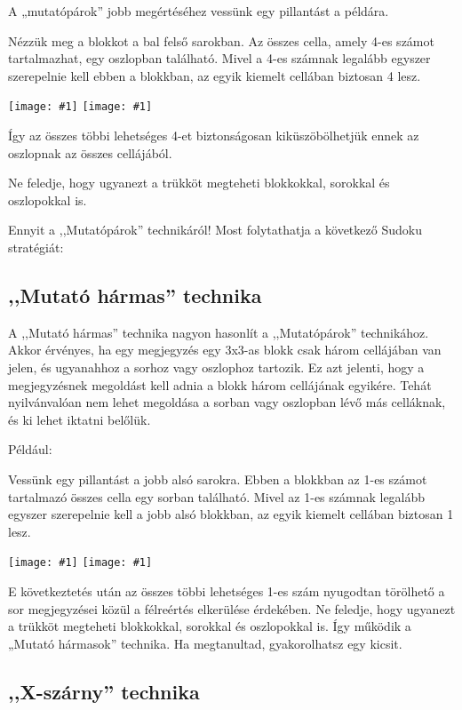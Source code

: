 \documentclass[a4paper,12pt,twoside]{article}
\newcommand{\kep}[1]{\texttt{[image: \#1]}}
\begin{document}
A „mutatópárok” jobb megértéséhez vessünk egy pillantást a példára.

Nézzük meg a blokkot a bal felső sarokban. Az összes cella, amely 4-es számot tartalmazhat, egy oszlopban található. Mivel a 4-es számnak legalább egyszer szerepelnie kell ebben a blokkban, az egyik kiemelt cellában biztosan 4 lesz.

\kep{1646982767-11. Pointing pairs_1.png}
\kep{1646982767-11. Pointing pairs_2.png}

Így az összes többi lehetséges 4-et biztonságosan kiküszöbölhetjük ennek az oszlopnak az összes cellájából.

Ne feledje, hogy ugyanezt a trükköt megteheti blokkokkal, sorokkal és oszlopokkal is.

Ennyit a ,,Mutatópárok'' technikáról! Most folytathatja a következő Sudoku stratégiát:

\clearpage
\subsection{,,Mutató hármas'' technika}

A ,,Mutató hármas'' technika nagyon hasonlít a ,,Mutatópárok'' technikához. Akkor érvényes, ha egy megjegyzés egy 3x3-as blokk csak három cellájában van jelen, és ugyanahhoz a sorhoz vagy oszlophoz tartozik. Ez azt jelenti, hogy a megjegyzésnek megoldást kell adnia a blokk három cellájának egyikére. Tehát nyilvánvalóan nem lehet megoldása a sorban vagy oszlopban lévő más celláknak, és ki lehet iktatni belőlük.

Például:

Vessünk egy pillantást a jobb alsó sarokra. Ebben a blokkban az 1-es számot tartalmazó összes cella egy sorban található. Mivel az 1-es számnak legalább egyszer szerepelnie kell a jobb alsó blokkban, az egyik kiemelt cellában biztosan 1 lesz.

\kep{1646982168-12. Pointing triples _1.png}
\kep{1646982173-12. Pointing triples _2.png}

E következtetés után az összes többi lehetséges 1-es szám nyugodtan törölhető a sor megjegyzései közül a félreértés elkerülése érdekében.
Ne feledje, hogy ugyanezt a trükköt megteheti blokkokkal, sorokkal és oszlopokkal is.
Így működik a „Mutató hármasok” technika. Ha megtanultad, gyakorolhatsz egy kicsit.



\subsection{,,X-szárny'' technika}
\end{document}
